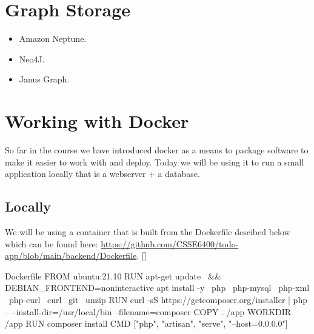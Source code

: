 \documentclass{csse4400}
\begin{document}
\section{Graph Storage}
\begin{itemize}
  \item Amazon Neptune.
  \item Neo4J.
  \item Janus Graph.
\end{itemize}

\section{Working with Docker}

So far in the course we have introduced docker as a means to package software to make it easier to work with and deploy.
Today we will be using it to run a small application locally that is a webserver + a database.



\subsection{Locally}

We will be using a container that is built from the Dockerfile descibed below which can be found here: 
\url{https://github.com/CSSE6400/todo-app/blob/main/backend/Dockerfile}. []

\begin{code}[language=docker]{Dockerfile}
FROM ubuntu:21.10
RUN apt-get update \
        && DEBIAN_FRONTEND=noninteractive apt install -y \
            php \
            php-mysql \
            php-xml \
            php-curl \
            curl \
            git \
            unzip
RUN curl -sS https://getcomposer.org/installer | php -- --install-dir=/usr/local/bin --filename=composer
COPY . /app
WORKDIR /app
RUN composer install
CMD ["php", "artisan", "serve", "--host=0.0.0.0"]
\end{code}
\end{document}
